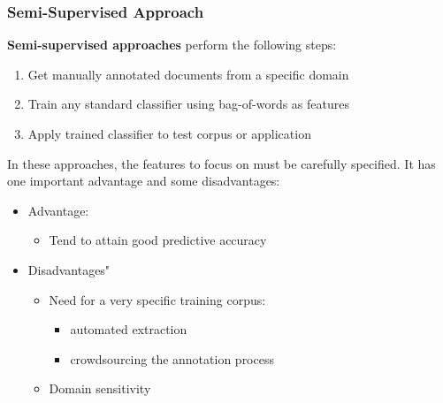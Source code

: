 \documentclass{article}
\begin{document}
\subsubsection{Semi-Supervised Approach}
\textbf{Semi-supervised approaches} perform the following steps:
\begin{enumerate}
    \item Get manually annotated documents from a specific domain
    \item Train any standard classifier using bag-of-words as features
    \item Apply trained classifier to test corpus or application
\end{enumerate}
In these approaches, the features to focus on must be carefully specified.
It has one important advantage and some disadvantages:
\begin{itemize}
    \item Advantage:
        \begin{itemize}
            \item Tend to attain good predictive accuracy
        \end{itemize}
    \item Disadvantages"
        \begin{itemize}
            \item Need for a very specific training corpus:
                \begin{itemize}
                    \item automated extraction
                    \item crowdsourcing the annotation process
                \end{itemize}
            \item Domain sensitivity
        \end{itemize}
\end{itemize}
\end{document}
